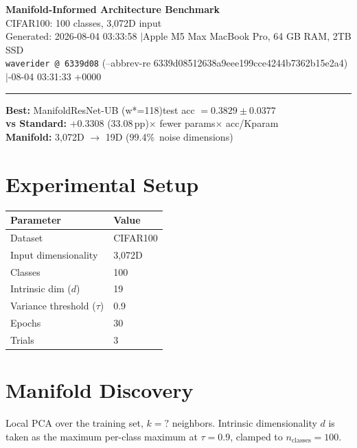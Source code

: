 \documentclass[11pt,letterpaper]{article}
\begin{document}
\begin{center}
  {\LARGE\bfseries\color{wavblue} Manifold-Informed Architecture Benchmark}\\[6pt]
  {\large CIFAR100: 100 classes, 3,072D input}\\[8pt]
  {\small Generated: 2026-08-04 03:33:58 \quad$|$\quad Apple M5 Max MacBook Pro, 64 GB RAM, 2TB SSD}\\[2pt]
  {\small\texttt{waverider @ 6339d08} (--abbrev-re
6339d08512638a9eee199cce4244b7362b15e2a4) \quad$|$-08-04 03:31:33 +0000}
\end{center}
{\color{wavblue}\noindent\rule{\linewidth}{1.5pt}}
\medskip

\noindent\colorbox{wavlight}{\parbox{\dimexpr\linewidth-2\fboxsep\relax}{
  \smallskip
  \textbf{Best:} ManifoldResNet-UB (w*=118)\quad test acc $= 0.3829 \pm 0.0377$\\[2pt]
  \textbf{vs Standard:} $+0.3308$ (33.08\,pp)$\times$ fewer params$\times$ acc/Kparam\\[2pt]
  \textbf{Manifold:} 3,072D $\rightarrow$ 19D (99.4\%\ noise dimensions)\\[2pt]
  \smallskip
}}
\bigskip

\section{Experimental Setup}

\begin{tabular}{@{}ll@{}}
\toprule
\textbf{Parameter} & \textbf{Value} \\
\midrule
  Dataset & CIFAR100 \\
  Input dimensionality & 3,072D \\
  Classes & 100 \\
  Intrinsic dim ($d$) & 19 \\
  Variance threshold ($\tau$) & 0.9 \\
  Epochs & 30 \\
  Trials & 3 \\
\bottomrule
\end{tabular}

\section{Manifold Discovery}

Local PCA over the training set, $k = ?$ neighbors. Intrinsic dimensionality $d$ is taken as the maximum per-class maximum at $\tau = 0.9$, clamped to $n_{\mathrm{classes}} = 100$.
\end{document}
